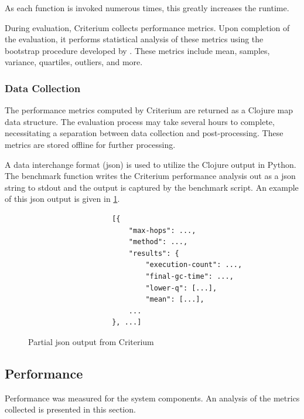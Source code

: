 			As each function is invoked numerous times, this greatly increases the runtime.
			
			During evaluation, Criterium collects performance metrics.  Upon completion of the evaluation, it performs statistical analysis of these metrics using the bootstrap procedure developed by \citeauthor{efron-87} \cite{efron-87}.  These metrics include mean, samples, variance, quartiles, outliers, and more.
		
			\subsubsection{Data Collection}
			\label{sec:data-collection}
				The performance metrics computed by Criterium are returned as a Clojure map data structure.  The evaluation process may take several hours to complete, necessitating a separation between data collection and post-processing.  These metrics are stored offline for further processing.
				
				A data interchange format (\gls{json}) is used to utilize the Clojure output in Python.  The benchmark function writes the Criterium performance analysis out as a \gls{json} string to stdout and the output is captured by the benchmark script.  An example of this \gls{json} output is given in \cref{fig:criterium-json-output}.
				
				\begin{figure}
					\centering %
					\begin{verbatim}
                    [{
                        "max-hops": ...,
                        "method": ...,
                        "results": {
                            "execution-count": ...,
                            "final-gc-time": ...,
                            "lower-q": [...],
                            "mean": [...],
                        ...
                    }, ...]
					\end{verbatim}
					
					\caption{Partial \gls{json} output from Criterium}
					\label{fig:criterium-json-output}
				\end{figure}
		
		\subsection{Performance}
		\label{sec:performance}
			Performance was measured for the system components.  An analysis of the metrics collected is presented in this section.
			
